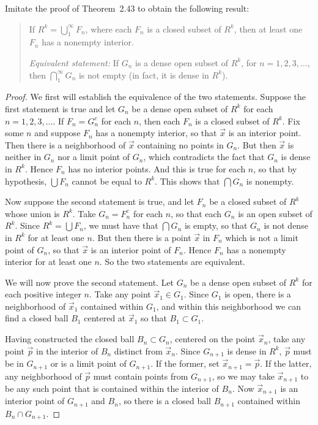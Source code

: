  Imitate the proof of Theorem~2.43 to obtain the
following result:
\begin{quote}
  If $R^k = \bigcup_1^\infty F_n$, where each $F_n$ is a closed subset
  of $R^k$, then at least one $F_n$ has a nonempty interior.

  {\em Equivalent statement:} If $G_n$ is a dense open subset of
  $R^k$, for $n = 1,2,3,\dots$, then $\bigcap_1^\infty G_n$ is not
  empty (in fact, it is dense in $R^k$).
\end{quote}
\begin{proof}
  We first will establish the equivalence of the two
  statements. Suppose the first statement is true and let $G_n$ be a
  dense open subset of $R^k$ for each $n = 1, 2, 3,\dots$. If
  $F_n = G_n^c$ for each $n$, then each $F_n$ is a closed subset of
  $R^k$. Fix some $n$ and suppose $F_n$ has a nonempty interior, so
  that $\vec{x}$ is an interior point. Then there is a neighborhood of
  $\vec{x}$ containing no points in $G_n$. But then $\vec{x}$ is
  neither in $G_n$ nor a limit point of $G_n$, which contradicts the
  fact that $G_n$ is dense in $R^k$. Hence $F_n$ has no interior
  points. And this is true for each $n$, so that by hypothesis,
  $\bigcup F_n$ cannot be equal to $R^k$. This shows that
  $\bigcap G_n$ is nonempty.

  Now suppose the second statement is true, and let $F_n$ be a closed
  subset of $R^k$ whose union is $R^k$. Take $G_n = F_n^c$ for each
  $n$, so that each $G_n$ is an open subset of $R^k$. Since
  $R^k = \bigcup F_n$, we must have that $\bigcap G_n$ is empty, so
  that $G_n$ is not dense in $R^k$ for at least one $n$. But then
  there is a point $\vec{x}$ in $F_n$ which is not a limit point of
  $G_n$, so that $\vec{x}$ is an interior point of $F_n$. Hence $F_n$
  has a nonempty interior for at least one $n$. So the two statements
  are equivalent.

  We will now prove the second statement. Let $G_n$ be a dense open
  subset of $R^k$ for each positive integer $n$. Take any point
  $\vec{x}_1\in G_1$. Since $G_1$ is open, there is a neighborhood of
  $\vec{x}_1$ contained within $G_1$, and within this neighborhood we
  can find a closed ball $B_1$ centered at $\vec{x}_1$ so that
  $B_1\subset G_1$.

  Having constructed the closed ball $B_n\subset G_n$, centered on the
  point $\vec{x}_n$, take any point $\vec{p}$ in the interior of $B_n$
  distinct from $\vec{x}_n$. Since $G_{n+1}$ is dense in $R^k$,
  $\vec{p}$ must be in $G_{n+1}$ or is a limit point of $G_{n+1}$. If
  the former, set $\vec{x}_{n+1} = \vec{p}$. If the latter, any
  neighborhood of $\vec{p}$ must contain points from $G_{n+1}$, so we
  may take $\vec{x}_{n+1}$ to be any such point that is contained
  within the interior of $B_n$. Now $\vec{x}_{n+1}$ is an interior
  point of $G_{n+1}$ and $B_n$, so there is a closed ball $B_{n+1}$
  contained within $B_n\cap G_{n+1}$.


\end{proof}
